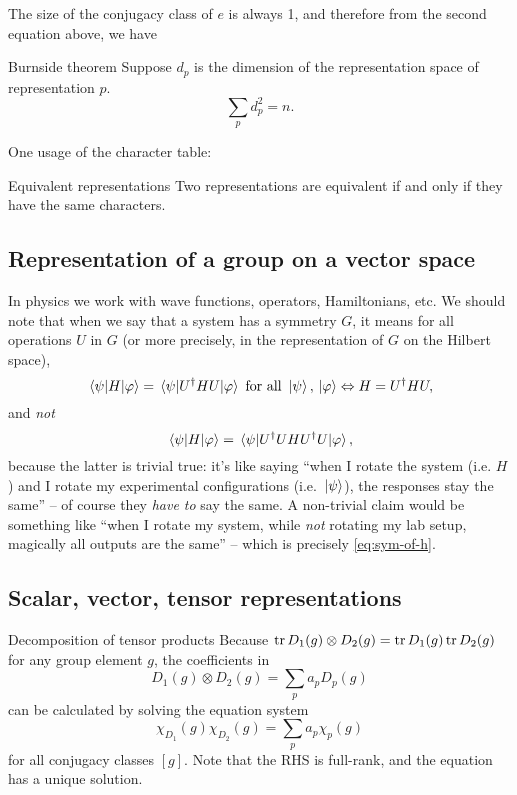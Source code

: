 \documentclass[hyperref, a4paper, 12pt]{article}
\begin{document}
The size of the conjugacy class of $e$ is always 1,
and therefore from the second equation above, we have 

\begin{quotebox*}{Burnside theorem}{}
    Suppose $d_p$ is the dimension of the representation space of representation $p$.
    \[
        \sum_p d_p^2 = n.
    \]
\end{quotebox*}

One usage of the character table:

\begin{quotebox*}{Equivalent representations}
    Two representations are equivalent if and only if they have the same characters.
\end{quotebox*}

\subsection{Representation of a group on a vector space}

In physics we work with wave functions, operators, Hamiltonians, etc.
We should note that when we say that a system has a symmetry $G$,
it means for all operations $U$ in $G$ (or more precisely,
in the representation of $G$ on the Hilbert space),
\begin{equation}
    \mel{\psi}{H}{\varphi} = \mel{\psi}{U^\dag H U}{\varphi} \text{ for all $\ket*{\psi}, \ket*{\varphi}$} \Leftrightarrow H = U^\dag H U,
    \label{eq:sym-of-h}
\end{equation}
and \emph{not}
\[
    \mel{\psi}{H}{\varphi} = \mel{\psi}{U^\dag U H U^\dag U}{\varphi},
\]
because the latter is trivial true:
it's like saying ``when I rotate the system (i.e. $H$) and I rotate my experimental configurations (i.e. $\ket*{\psi}$), the responses stay the same'' --
of course they \emph{have to} say the same.
A non-trivial claim would be something like ``when I rotate my system, while \emph{not} rotating my lab setup, magically all outputs are the same''
-- which is precisely \eqref{eq:sym-of-h}.

\subsection{Scalar, vector, tensor representations}\label{sec:tensor-group-rep}

\begin{quotebox*}{Decomposition of tensor products}{}
    Because $\trace{D_1(g) \otimes D_2(g)} = \trace{D_1(g)} \trace{D_2(g)}$
    for any group element $g$,
    the coefficients in 
    \begin{equation*}
        D_1(g) \otimes D_2(g) = \sum_p a_p D_p(g)
    \end{equation*}
    can be calculated by solving the equation system
    \begin{equation*}
        \chi_{D_1}(g) \chi_{D_2}(g) = \sum_{p} a_p \chi_p(g)
    \end{equation*}
    for all conjugacy classes $[g]$.
    Note that the RHS is full-rank, and the equation has a unique solution.
\end{quotebox*}
\end{document}
